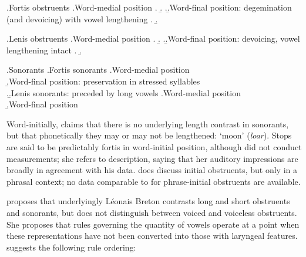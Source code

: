 \ex.Fortis obstruents
\a.Word-medial position
\a.
\b.
\z.\b.Word-final position: degemination (and devoicing) with vowel lengthening
\a.
\b.

\ex.Lenis obstruents
\a.Word-medial position
\a.
\b.
\z.\b.Word-final position: devoicing, vowel lengthening intact
\a.
\b.

\ex.Sonorants
\a.Fortis sonorants
\a.Word-medial position\\
\b.Word-final position: preservation in stressed syllables\\
\z.\b.Lenis sonorants: preceded by long vowels
\a.Word-medial position\\
\b.Word-final position\\

Word-initially, \citet{carlyle88:_breton} claims that there is no underlying length contrast in sonorants, but that phonetically they may or may not be lengthened: \ipa{[ˈl(ː)oːar]} `moon' (\emph{loar}). Stops are said to be predictably fortis in word-initial position, although \citet{carlyle88:_breton} did not conduct measurements; she refers to  description, saying that her auditory impressions are broadly in agreement with his data. \citet[pp.~63--65]{falchun} does discuss initial obstruents, but only in a phrasal context; no data comparable to  for phrase-initial obstruents are available.

\citet{carlyle88:_breton} proposes that underlyingly Léonais Breton contrasts long and short obstruents and sonorants, but does not distinguish between voiced and voiceless obstruents. She proposes that rules governing the quantity of vowels operate at a point when these representations have not been converted into those with laryngeal features. \citet{carlyle88:_breton} suggests the following rule ordering:

